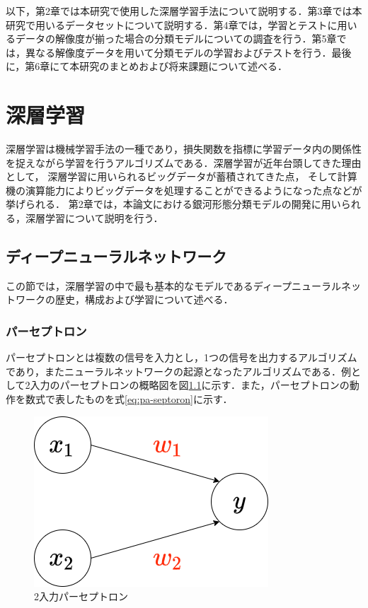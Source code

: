 \documentclass[a4j, 11pt]{jreport}
\begin{document}
以下，第2章では本研究で使用した深層学習手法について説明する．第3章では本研究で用いるデータセットについて説明する．第4章では，学習とテストに用いるデータの解像度が揃った場合の分類モデルについての調査を行う．第5章では，異なる解像度データを用いて分類モデルの学習およびテストを行う．最後に，第6章にて本研究のまとめおよび将来課題について述べる．


\newpage
\chapter{深層学習}
深層学習は機械学習手法の一種であり，損失関数を指標に学習データ内の関係性を捉えながら学習を行うアルゴリズムである．深層学習が近年台頭してきた理由として，
深層学習に用いられるビッグデータが蓄積されてきた点，
そして計算機の演算能力によりビッグデータを処理することができるようになった点などが挙げられる．
第2章では，本論文における銀河形態分類モデルの開発に用いられる，深層学習について説明を行う．

\section{ディープニューラルネットワーク}
この節では，深層学習の中で最も基本的なモデルであるディープニューラルネットワークの歴史，構成および学習について述べる．

\subsection{パーセプトロン}
パーセプトロンとは複数の信号を入力とし，1つの信号を出力するアルゴリズムであり，またニューラルネットワークの起源となったアルゴリズムである．例として2入力のパーセプトロンの概略図を図\ref{fig:pa-septoron}に示す．また，パーセプトロンの動作を数式で表したものを式\ref{eq:pa-septoron}に示す．

\begin{figure}[H]
  \centering
  \includegraphics[width=0.50\hsize, keepaspectratio]{images/drawio/pa-seputoron.png}
  \caption{2入力パーセプトロン}
  \label{fig:pa-septoron}
 \end{figure}
\end{document}
